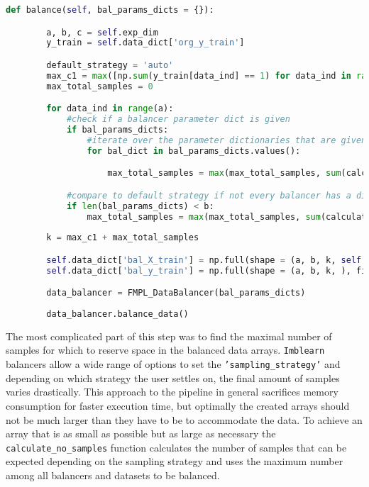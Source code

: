\begin{lstlisting}[language=Python, numbers=none]
    def balance(self, bal_params_dicts = {}):

        a, b, c = self.exp_dim
        y_train = self.data_dict['org_y_train']

        default_strategy = 'auto'
        max_c1 = max([np.sum(y_train[data_ind] == 1) for data_ind in range(a)])
        max_total_samples = 0

        for data_ind in range(a):
            #check if a balancer parameter dict is given
            if bal_params_dicts:
                #iterate over the parameter dictionaries that are given
                for bal_dict in bal_params_dicts.values():

                    max_total_samples = max(max_total_samples, sum(calculate_no_samples(y_train[data_ind], bal_dict['sampling_strategy']).values()))

            #compare to default strategy if not every balancer has a dict
            if len(bal_params_dicts) < b:
                max_total_samples = max(max_total_samples, sum(calculate_no_samples(y_train[data_ind], default_strategy).values()))
        
        k = max_c1 + max_total_samples

        self.data_dict['bal_X_train'] = np.full(shape = (a, b, k, self.d), fill_value = np.nan)
        self.data_dict['bal_y_train'] = np.full(shape = (a, b, k, ), fill_value = np.nan)

        data_balancer = FMPL_DataBalancer(bal_params_dicts)
        
        data_balancer.balance_data()
\end{lstlisting}

The most complicated part of this step was to find the maximal number of samples for which to reserve space in the balanced data arrays.
\texttt{Imblearn} balancers allow a wide range of options to set the \texttt{'sampling\_strategy'} and depending on which strategy the user settles on,
the final amount of samples varies drastically. This approach to the pipeline in general sacrifices memory consumption for faster execution time, 
but optimally the created arrays should not be much larger than they have to be to accommodate the data. 
To achieve an array that is as small as possible but as large as necessary the \texttt{calculate\_no\_samples} function calculates the number of samples
that can be expected depending on the sampling strategy and uses the maximum number among all balancers and datasets to be balanced.

